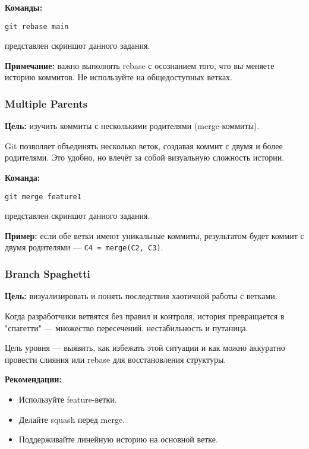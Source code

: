 \documentclass[a4paper,12pt]{report}
\begin{document}
\textbf{Команды:}
\begin{verbatim}
git rebase main
\end{verbatim}

 представлен скриншот данного задания.

\textbf{Примечание:} важно выполнять rebase с осознанием того, что вы меняете историю коммитов. Не используйте на общедоступных ветках.

\subsubsection{Multiple Parents}
\textbf{Цель:} изучить коммиты с несколькими родителями (merge-коммиты).

Git позволяет объединять несколько веток, создавая коммит с двумя и более родителями. Это удобно, но влечёт за собой визуальную сложность истории.

\textbf{Команда:}
\begin{verbatim}
git merge feature1
\end{verbatim}

 представлен скриншот данного задания.

\textbf{Пример:} если обе ветки имеют уникальные коммиты, результатом будет коммит с двумя родителями — \texttt{C4 = merge(C2, C3)}.

\subsubsection{Branch Spaghetti}
\textbf{Цель:} визуализировать и понять последствия хаотичной работы с ветками.

Когда разработчики ветвятся без правил и контроля, история превращается в "спагетти" — множество пересечений, нестабильность и путаница.

Цель уровня — выявить, как избежать этой ситуации и как можно аккуратно провести слияния или rebase для восстановления структуры.

\textbf{Рекомендации:}
\begin{itemize}[noitemsep]
  \item Используйте feature-ветки.
  \item Делайте squash перед merge.
  \item Поддерживайте линейную историю на основной ветке.
\end{itemize}
\end{document}
